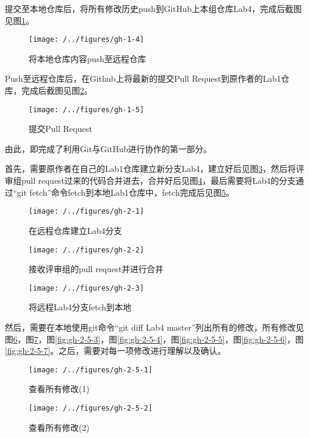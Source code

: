 提交至本地仓库后，将所有修改历史push到GitHub上本组仓库Lab4，完成后截图见图\ref{fig:gh-1-4}。

\begin{figure}
\centering
\texttt{[image: /../figures/gh-1-4]}
\caption{将本地仓库内容push至远程仓库}
\label{fig:gh-1-4}
\end{figure}

Push至远程仓库后，在Github上将最新的提交Pull Request到原作者的Lab1仓库，完成后截图见图\ref{fig:gh-1-5}。

\begin{figure}
\centering
\texttt{[image: /../figures/gh-1-5]}
\caption{提交Pull Request}
\label{fig:gh-1-5}
\end{figure}

由此，即完成了利用Git与GitHub进行协作的第一部分。

首先，需要原作者在自己的Lab1仓库建立新分支Lab4，建立好后见图\ref{fig:gh-2-1}，然后将评审组pull request过来的代码合并进去，合并好后见图\ref{fig:gh-2-2}，最后需要将Lab4的分支通过“git fetch”命令fetch到本地Lab1仓库中，fetch完成后见图\ref{fig:gh-2-3}。

\begin{figure}
\centering
\texttt{[image: /../figures/gh-2-1]}
\caption{在远程仓库建立Lab4分支}
\label{fig:gh-2-1}
\end{figure}

\begin{figure}
\centering
\texttt{[image: /../figures/gh-2-2]}
\caption{接收评审组的pull request并进行合并}
\label{fig:gh-2-2}
\end{figure}

\begin{figure}
\centering
\texttt{[image: /../figures/gh-2-3]}
\caption{将远程Lab4分支fetch到本地}
\label{fig:gh-2-3}
\end{figure}

然后，需要在本地使用git命令“git diff Lab4 master”列出所有的修改，所有修改见图\ref{fig:gh-2-5-1}，图\ref{fig:gh-2-5-2}，图\ref{fig:gh-2-5-3}，图\ref{fig:gh-2-5-4}，图\ref{fig:gh-2-5-5}，图\ref{fig:gh-2-5-6}，图\ref{fig:gh-2-5-7}。之后，需要对每一项修改进行理解以及确认。

\begin{figure}
\centering
\texttt{[image: /../figures/gh-2-5-1]}
\caption{查看所有修改(1)}
\label{fig:gh-2-5-1}
\end{figure}

\begin{figure}
\centering
\texttt{[image: /../figures/gh-2-5-2]}
\caption{查看所有修改(2)}
\label{fig:gh-2-5-2}
\end{figure}

